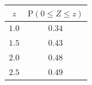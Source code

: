 {\setlength{\tabcolsep}{5pt}\renewcommand{\arraystretch}{1.25}%
\begin{tabular}{|c|c|}
\hline
$z$ & $\mathrm{P}(0\le Z\le z)$ \\
\hline
$1.0$ & $0.34$ \\
\hline
$1.5$ & $0.43$ \\
\hline
$2.0$ & $0.48$ \\
\hline
$2.5$ & $0.49$ \\
\hline
\end{tabular}}
